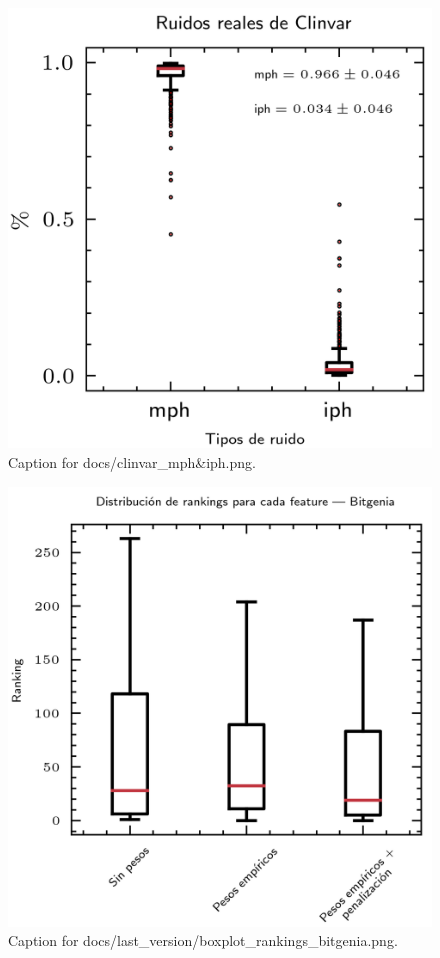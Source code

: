 \documentclass{article}
\begin{document}
\begin{figure}[h] \centering \includegraphics{docs/clinvar_mph&iph.png} \caption{Caption for docs/clinvar_mph&iph.png.} \end{figure}
\begin{figure}[h] \centering \includegraphics{docs/last_version/boxplot_rankings_bitgenia.png} \caption{Caption for docs/last_version/boxplot_rankings_bitgenia.png.} \end{figure}
\end{document}
